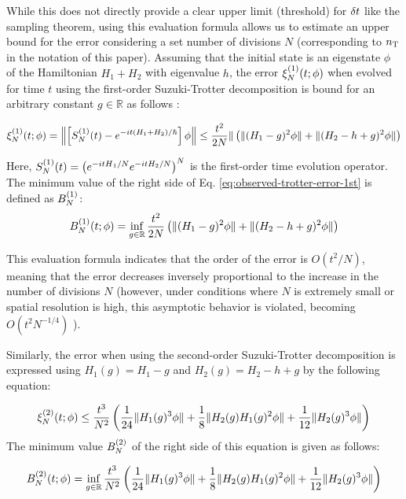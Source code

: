 \documentclass[jctc-draft.tex]{subfiles}
\begin{document}
While this does not directly provide a clear upper limit (threshold) for
$\delta t$ like the sampling theorem, using this evaluation formula allows us to
estimate an upper bound for the error considering a set number of divisions $N$
(corresponding to $n_{\mathrm{T}}$ in the notation of this paper). Assuming that the initial
state is an eigenstate $\phi$ of the Hamiltonian $H_1+H_2$ with eigenvalue $h$,
the error $\xi_{N}^{(1)}(t;\phi)$ when evolved for time $t$ using the first-order
Suzuki-Trotter decomposition is bound for an arbitrary constant
$g\in\mathbb{R}$ as follows \cite{Burgarth2024.PhysRevResearch.6.043155}:

\begin{equation}
    \xi_{N}^{(1)}(t;\phi)=\left\|\left[S_{N}^{(1)}(t)-e^{-it(H_1+H_2)/\hbar}\right]\phi\right\|
    \leq\frac{t^2}{2N}\| \left(\|(H_1-g)^2\phi\|+\|(H_2-h+g)^2\phi\|\right)
    \label{eq:observed-trotter-error-1st}
\end{equation}

Here, $S_{N}^{(1)}(t) = \left(e^{-i{tH}_1/N}e^{-itH_2/N}\right)^N$ is the first-order
time evolution operator. The minimum value of the right side of Eq.
\eqref{eq:observed-trotter-error-1st} is defined as $B_{N}^{(1)}$:
\begin{equation}
B_{N}^{(1)}(t;\phi)=\inf_{g\in\mathbb{R}}\frac{t^2}{2N}
    \left(\|(H_1-g)^2\phi\|+\|(H_2-h+g)^2\phi\|\right)
\label{eq:observed-trotter-error-bound-1st}
\end{equation}

This evaluation formula indicates that the order of the error is $O(t^2/N)$,
meaning that the error decreases inversely proportional to the increase in the
number of divisions $N$ (however, under conditions where $N$ is extremely small
or spatial resolution is high, this asymptotic behavior is violated, becoming
$O(t^2 N^{-1/4})$ \cite{Burgarth2024.PhysRevResearch.6.043155}).

Similarly, the error when using the second-order Suzuki-Trotter decomposition is
expressed using $H_1(g) = H_1-g$ and $H_2(g) = H_2-h+g$ by the following equation:

\begin{equation}
  \xi_{N}^{(2)}(t;\phi)\leq\frac{t^3}{N^2}\left(\frac{1}{24}\|H_1(g)^3\phi\| + \frac{1}{8}\|H_2(g)H_1(g)^2\phi\|
  +\frac{1}{12}\|H_2(g)^3\phi\|\right)
    \label{eq:observed-trotter-error-2nd}
\end{equation}
The minimum value $B_{N}^{(2)}$ of the right side of this equation is given as follows:

\begin{equation}
B_{N}^{(2)}(t;\phi)=\inf_{g\in\mathbb{R}}\frac{t^3}{N^2}
    \left(\frac{1}{24}\|H_1(g)^3\phi\| + \frac{1}{8}\|H_2(g)H_1(g)^2\phi\|
  +\frac{1}{12}\|H_2(g)^3\phi\|\right)
\label{eq:observed-trotter-error-bound-2nd}
\end{equation}
\end{document}
